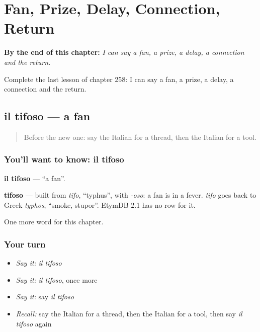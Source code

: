 
\chapter{Fan, Prize, Delay, Connection, Return}
\label{ch:it-fan-prize-delay-connection-return}

\begin{chapteropening}
\textbf{By the end of this chapter:} \emph{I can say a fan, a prize, a delay, a connection and the return.}

Complete the last lesson of chapter 258: I can say a fan, a prize, a delay, a connection and the return.
\end{chapteropening}

\section[il tifoso]{il tifoso — a fan}

\label{lesson:IT-C258-tifoso}



\begin{quote}
Before the new one: say the Italian for a thread, then the Italian for a tool.
\end{quote}

\subsection*{You'll want to know: il tifoso}
\textbf{il tifoso} — \textquotedblleft{}a fan\textquotedblright{}.

\begin{cousinweb}
\textbf{tifoso} — built from \emph{tifo}, \textquotedblleft{}typhus\textquotedblright{}, with \emph{-oso}: a fan is in a fever. \emph{tifo} goes back to Greek \emph{typhos}, \textquotedblleft{}smoke, stupor\textquotedblright{}. EtymDB 2.1 has no row for it.
\end{cousinweb}

\begin{grammarlens}[title={What you've built}]
One more word for this chapter.
\end{grammarlens}

\subsection*{Your turn}
\begin{itemize}
\raggedright
  \item \emph{Say it:} \emph{il tifoso}
  \item \emph{Say it:} \emph{il tifoso}, once more
  \item \emph{Say it:} say \emph{il tifoso}
  \item \emph{Recall:} say the Italian for a thread, then the Italian for a tool, then say \emph{il tifoso} again
\end{itemize}

